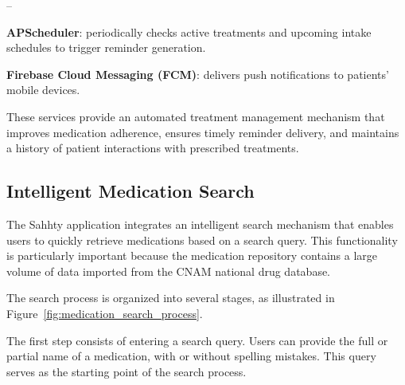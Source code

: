 \begin{list}{--}{}
 \setlength\itemsep{-0.5em}
    \item \textbf{APScheduler}: periodically checks active treatments and upcoming intake schedules to trigger reminder generation.

    \item \textbf{Firebase Cloud Messaging (FCM)}: delivers push notifications to patients' mobile devices.
\end{list}

These services provide an automated treatment management mechanism that improves medication adherence, ensures timely reminder delivery, and maintains a history of patient interactions with prescribed treatments.


















































\subsection{Intelligent Medication Search}
\label{subsec:medication_search}

The Sahhty application integrates an intelligent search mechanism that enables users to quickly retrieve medications based on a search query. This functionality is particularly important because the medication repository contains a large volume of data imported from the CNAM national drug database.

The search process is organized into several stages, as illustrated in Figure~\ref{fig:medication_search_process}.

The first step consists of entering a search query. Users can provide the full or partial name of a medication, with or without spelling mistakes. This query serves as the starting point of the search process.

